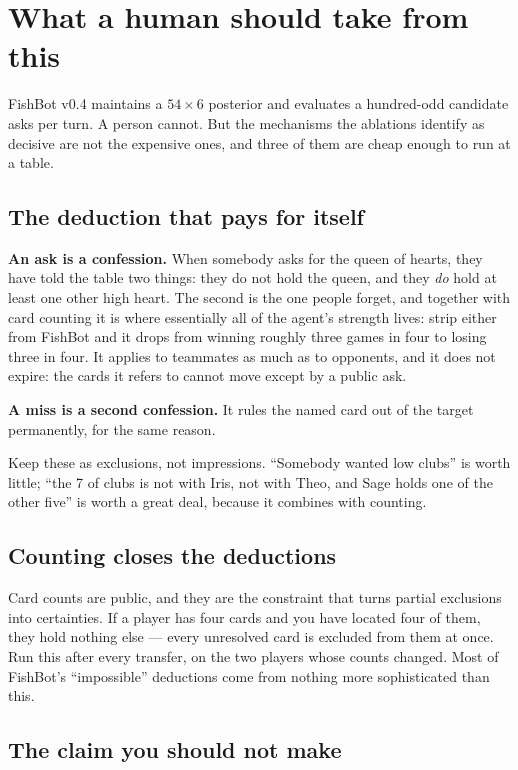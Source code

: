 \section{What a human should take from this}
\label{sec:playbook}

FishBot v0.4 maintains a $54 \times 6$ posterior and evaluates a hundred-odd
candidate asks per turn. A person cannot. But the mechanisms the ablations
identify as decisive are not the expensive ones, and three of them are cheap
enough to run at a table.

\subsection{The deduction that pays for itself}

\textbf{An ask is a confession.} When somebody asks for the queen of hearts, they
have told the table two things: they do not hold the queen, and they \emph{do}
hold at least one other high heart. The second is the one people forget, and
together with card counting it is where essentially all of the agent's strength
lives: strip either from FishBot and it drops from winning roughly three games in
four to losing three in four. It applies to teammates as
much as to opponents, and it does not expire: the cards it refers to cannot move
except by a public ask.

\textbf{A miss is a second confession.} It rules the named card out of the target
permanently, for the same reason.

Keep these as exclusions, not impressions. ``Somebody wanted low clubs'' is worth
little; ``the 7 of clubs is not with Iris, not with Theo, and Sage holds one of
the other five'' is worth a great deal, because it combines with counting.

\subsection{Counting closes the deductions}

Card counts are public, and they are the constraint that turns partial exclusions
into certainties. If a player has four cards and you have located four of them,
they hold nothing else --- every unresolved card is excluded from them at once.
Run this after every transfer, on the two players whose counts changed. Most of
FishBot's ``impossible'' deductions come from nothing more sophisticated than
this.

\subsection{The claim you should not make}

